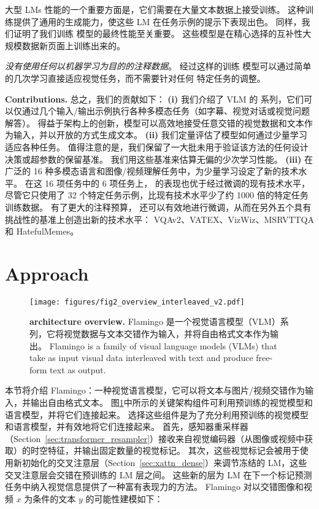 \parbox{\textwidth}{大型 LMs 性能的一个重要方面是，它们需要在大量文本数据上接受训练。
这种训练提供了通用的生成能力，使这些 LM 在任务示例的提示下表现出色。
同样，我们证明了我们训练
\method{}模型的最终性能至关重要。
这些模型是在精心选择的互补性大规模数据新页面上训练出来的。\parfillskip=0pt} \emph{没有使用任何以机器学习为目的的注释数据}。
经过这样的训练
\method{} 模型可以通过简单的几次学习直接适应视觉任务，而不需要针对任何
特定任务的调整。



\noindent
\textbf{Contributions.}
总之，我们的贡献如下：
\textbf{(i)} 我们介绍了 VLM 的 \method{} 系列，它们可以仅通过几个输入/输出示例执行各种多模态任务（如字幕、视觉对话或视觉问题解答）。
得益于架构上的创新，\method{}模型可以高效地接受任意交错的视觉数据和文本作为输入，并以开放的方式生成文本。%
\textbf{(ii)} 我们定量评估了模型如何通过少量学习适应各种任务。%
值得注意的是，我们保留了一大批未用于验证该方法的任何设计决策或超参数的保留基准。
我们用这些基准来估算无偏的少次学习性能。
\textbf{(iii)} \largem{} 在广泛的 16 种多模态语言和图像/视频理解任务中，为少量学习设定了新的技术水平。
在这 16 项任务中的 6 项任务上，\largem{} 的表现也优于经过微调的现有技术水平，尽管它只使用了 32 个特定任务示例，比现有技术水平少了约 1000 倍的特定任务训练数据。
有了更大的注释预算，\largem{} 还可以有效地进行微调，从而在另外五个具有挑战性的基准上创造出新的技术水平： VQAv2、VATEX、VizWiz、MSRVTTQA 和 HatefulMemes。







\section{Approach}
\label{sec:approach}

\begin{figure}[t!]
\texttt{[image: figures/fig2\_overview\_interleaved\_v2.pdf]}
\centering
\caption{\capfontsize{} \textbf{\method{} architecture overview.} 
Flamingo 是一个视觉语言模型（VLM）系列，它将视觉数据与文本交错作为输入，并将自由格式文本作为输出。
Flamingo is a family of visual language models (VLMs) that take as input visual data interleaved with text and  produce free-form text as output. 
}
\label{fig:overview}
\end{figure}

本节将介绍 Flamingo：一种视觉语言模型，它可以将文本与图片/视频交错作为输入，并输出自由格式文本。%
图\ref{fig:overview}中所示的关键架构组件可利用预训练的视觉模型和语言模型，并将它们连接起来。
选择这些组件是为了充分利用预训练的视觉模型和语言模型，并有效地将它们连接起来。
首先，感知器重采样器（Section~\ref{sec:transformer_resampler}）接收来自视觉编码器（从图像或视频中获取）的时空特征，并输出固定数量的视觉标记。
其次，这些视觉标记会被用于使用新初始化的交叉注意层（Section~\ref{sec:xattn_dense}）来调节冻结的 LM，这些交叉注意层会交错在预训练的 LM 层之间。
这些新的层为 LM 在下一个标记预测任务中纳入视觉信息提供了一种富有表现力的方法。%
Flamingo 对以交错图像和视频 $x$ 为条件的文本 $y$ 的可能性建模如下：


